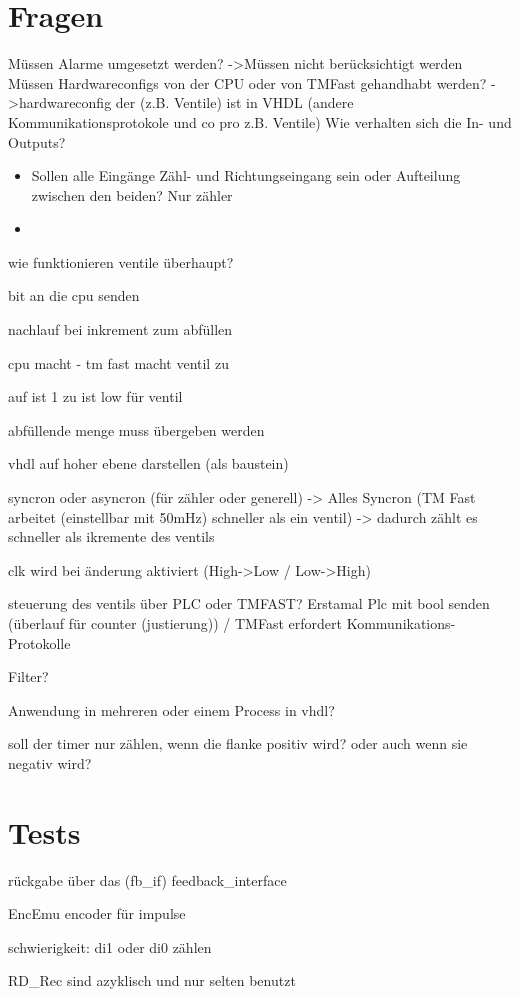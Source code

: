 \chapter{Fragen}
Müssen Alarme umgesetzt werden? ->Müssen nicht berücksichtigt werden
Müssen Hardwareconfigs von der CPU oder von TMFast gehandhabt werden? ->hardwareconfig der (z.B. Ventile) ist in VHDL (andere Kommunikationsprotokole und co pro z.B. Ventile)
Wie verhalten sich die In- und Outputs? 
\begin{itemize}
    \item Sollen alle Eingänge Zähl- und Richtungseingang sein oder Aufteilung zwischen den beiden? Nur zähler
    \item 
\end{itemize}

wie funktionieren ventile überhaupt?

bit an die cpu senden 

nachlauf bei inkrement zum abfüllen

cpu macht  - tm fast macht ventil zu

auf ist 1 zu ist low für ventil

abfüllende menge muss übergeben werden

vhdl auf hoher ebene darstellen (als baustein)

syncron oder asyncron (für zähler oder generell) -> Alles Syncron (TM Fast arbeitet (einstellbar mit 50mHz) schneller als ein ventil) -> dadurch zählt es schneller als ikremente des ventils

clk wird bei änderung aktiviert (High->Low / Low->High)

steuerung des ventils über PLC oder TMFAST? Erstamal Plc mit bool senden (überlauf für counter (justierung)) / TMFast erfordert Kommunikations-Protokolle

Filter?

Anwendung in mehreren oder einem Process in vhdl?

soll der timer nur zählen, wenn die flanke positiv wird? oder auch wenn sie negativ wird?

\chapter{Tests}

rückgabe über das (fb\_if) feedback\_interface

EncEmu encoder für impulse 

schwierigkeit: di1 oder di0 zählen

RD\_Rec sind azyklisch und nur selten benutzt

